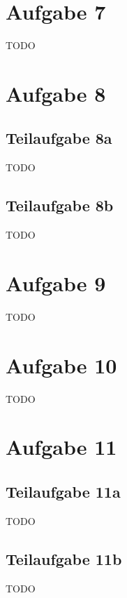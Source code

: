 \documentclass[a4paper]{scrartcl}
\begin{document}
\section*{Aufgabe 7}
TODO

\section*{Aufgabe 8}
\subsection*{Teilaufgabe 8a}
TODO
\subsection*{Teilaufgabe 8b}
TODO

\section*{Aufgabe 9}
TODO

\section*{Aufgabe 10}
TODO

\section*{Aufgabe 11}
\subsection*{Teilaufgabe 11a}
TODO
\subsection*{Teilaufgabe 11b}
TODO
\end{document}
